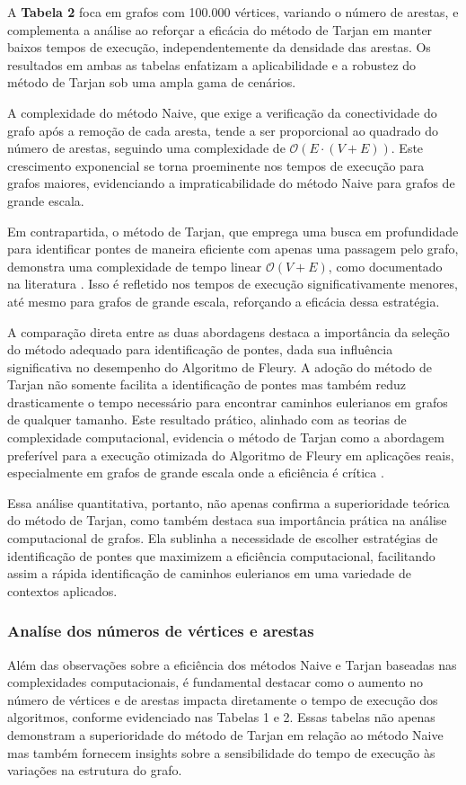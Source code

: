 \documentclass[12pt]{article}
\begin{document}
A \textbf{Tabela 2} foca em grafos com 100.000 vértices, variando o número de arestas, e complementa a análise ao reforçar a eficácia do método de Tarjan em manter baixos tempos de execução, independentemente da densidade das arestas. Os resultados em ambas as tabelas enfatizam a aplicabilidade e a robustez do método de Tarjan sob uma ampla gama de cenários.

A complexidade do método Naive, que exige a verificação da conectividade do grafo após a remoção de cada aresta, tende a ser proporcional ao quadrado do número de arestas, seguindo uma complexidade de \(\mathcal{O}(E \cdot (V+E))\). Este crescimento exponencial se torna proeminente nos tempos de execução para grafos maiores, evidenciando a impraticabilidade do método Naive para grafos de grande escala.

Em contrapartida, o método de Tarjan, que emprega uma busca em profundidade para identificar pontes de maneira eficiente com apenas uma passagem pelo grafo, demonstra uma complexidade de tempo linear \(\mathcal{O}(V+E)\), como documentado na literatura \cite{tarjan1972depth}. Isso é refletido nos tempos de execução significativamente menores, até mesmo para grafos de grande escala, reforçando a eficácia dessa estratégia.

A comparação direta entre as duas abordagens destaca a importância da seleção do método adequado para identificação de pontes, dada sua influência significativa no desempenho do Algoritmo de Fleury. A adoção do método de Tarjan não somente facilita a identificação de pontes mas também reduz drasticamente o tempo necessário para encontrar caminhos eulerianos em grafos de qualquer tamanho. Este resultado prático, alinhado com as teorias de complexidade computacional, evidencia o método de Tarjan como a abordagem preferível para a execução otimizada do Algoritmo de Fleury em aplicações reais, especialmente em grafos de grande escala onde a eficiência é crítica \cite{fleury1883problemes}.

Essa análise quantitativa, portanto, não apenas confirma a superioridade teórica do método de Tarjan, como também destaca sua importância prática na análise computacional de grafos. Ela sublinha a necessidade de escolher estratégias de identificação de pontes que maximizem a eficiência computacional, facilitando assim a rápida identificação de caminhos eulerianos em uma variedade de contextos aplicados.

\subsubsection{Analíse dos números de vértices e arestas}
Além das observações sobre a eficiência dos métodos Naive e Tarjan baseadas nas complexidades computacionais, é fundamental destacar como o aumento no número de vértices e de arestas impacta diretamente o tempo de execução dos algoritmos, conforme evidenciado nas Tabelas 1 e 2. Essas tabelas não apenas demonstram a superioridade do método de Tarjan em relação ao método Naive mas também fornecem insights sobre a sensibilidade do tempo de execução às variações na estrutura do grafo.
\end{document}
